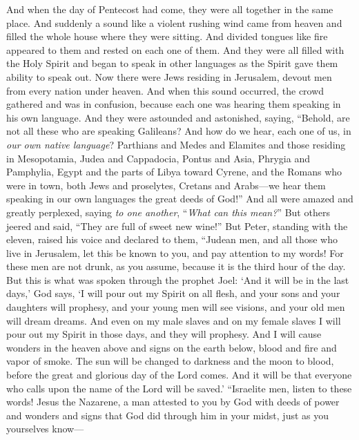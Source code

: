 \begin{biblechapter} %
 And when the day of Pentecost had come, they were all together in the same place.
\verse And suddenly a sound like a violent rushing wind came from heaven and filled the whole house where they were sitting.
\verse And divided tongues like fire appeared to them and rested on each one of them.
\verse And they were all filled with the Holy Spirit and began to speak in other languages as the Spirit gave them ability to speak out.
\verse Now there were Jews residing in Jerusalem, devout men from every nation under heaven.
\verse And when this sound occurred, the crowd gathered and was in confusion, because each one was hearing them speaking in his own language.
\verse And they were astounded and astonished, saying, “Behold, are not all these who are speaking Galileans?
\verse And how do we hear, each one of us, in \textit{our own native language}?
\verse Parthians and Medes and Elamites and those residing in Mesopotamia, Judea and Cappadocia, Pontus and Asia,
\verse Phrygia and Pamphylia, Egypt and the parts of Libya toward Cyrene, and the Romans who were in town,
\verse both Jews and proselytes, Cretans and Arabs—we hear them speaking in our own languages the great deeds of God!”
\verse And all were amazed and greatly perplexed, saying \textit{to one another}, “\textit{What can this mean?}”
\verse But others jeered and said, “They are full of sweet new wine!”
 But Peter, standing with the eleven, raised his voice and declared to them, “Judean men, and all those who live in Jerusalem, let this be known to you, and pay attention to my words!
\verse For these men are not drunk, as you assume, because it is the third hour of the day.
\verse But this is what was spoken through the prophet Joel:
\verse ‘And it will be in the last days,’ God says, 
‘I will pour out my Spirit on all flesh, 
and your sons and your daughters will prophesy, 
and your young men will see visions, 
and your old men will dream dreams.
\verse And even on my male slaves and on my female slaves 
I will pour out my Spirit in those days, and they will prophesy.
\verse And I will cause wonders in the heaven above 
and signs on the earth below, 
blood and fire and vapor of smoke.
\verse The sun will be changed to darkness 
and the moon to blood, 
before the great and glorious day of the Lord comes.
\verse And it will be that everyone who calls upon the name of the Lord will be saved.’
\verse “Israelite men, listen to these words! Jesus the Nazarene, a man attested to you by God with deeds of power and wonders and signs that God did through him in your midst, just as you yourselves know—

\end{biblechapter}
